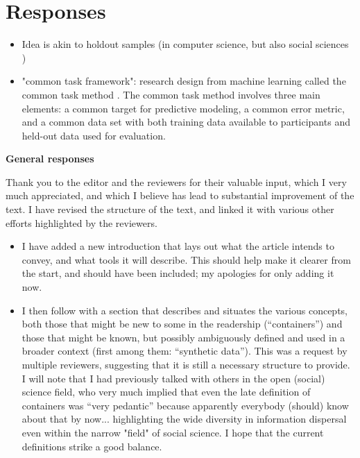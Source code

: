 
\section{Responses}

\begin{itemize}

\item Idea is akin to holdout samples (in computer science, but also social sciences \citep{liu_successes_2019}) 
\item "common task framework": research design from machine learning called the common task method \citep{donoho_50_2017,liberman_obituary_2010}. The common task method involves three main elements: a common target for predictive modeling, a common error metric, and a common data set with both training data available to participants and held-out data used for evaluation. \citep{liu_successes_2019}

\end{itemize}

\textbf{General responses}

\begin{response}
    Thank you to the editor and the reviewers for their valuable input, which I very much appreciated, and which I believe has lead to substantial improvement of the text. I have revised the structure of the text, and linked it with various other efforts highlighted by the reviewers. 

    \begin{itemize}
        \item I have added a new introduction that lays out what the article intends to convey, and what tools it will describe. This should help make it clearer from the start, and should have been included; my apologies for only adding it now.
        \item I then follow with a section that describes and situates the various concepts, both those that might be new to some in the readership (``containers'') and those that might be known, but possibly ambiguously defined and used in a broader context (first among them: ``synthetic data''). This was a request by multiple reviewers, suggesting that it is still a necessary structure to provide. I will note that I had previously talked with others in the open (social) science field, who very much implied that even the late definition of containers was ``very pedantic'' because apparently everybody (should) know about that by now... highlighting the wide diversity in information dispersal even within the narrow "field" of social science. I hope that the current definitions strike a good balance.
    \end{itemize}
\end{response}

